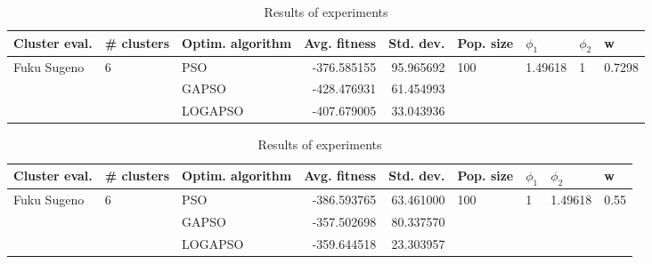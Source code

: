 \documentclass{article}
\begin{document}
\begin{table}
\centering
\caption{Results of experiments}
\begin{tabular}{lllrrllll}
\toprule
               Cluster eval. &        \# clusters & Optim. algorithm &  Avg. fitness &  Std. dev. &            Pop. size &               $\phi_{1}$ &         $\phi_{2}$ &                       w \\
\midrule
\multirow{3}{*}{Fuku Sugeno} & \multirow{3}{*}{6} &              PSO &   -376.585155 &  95.965692 & \multirow{3}{*}{100} & \multirow{3}{*}{1.49618} & \multirow{3}{*}{1} & \multirow{3}{*}{0.7298} \\
                             &                    &            GAPSO &   -428.476931 &  61.454993 &                      &                          &                    &                         \\
                             &                    &          LOGAPSO &   -407.679005 &  33.043936 &                      &                          &                    &                         \\
\bottomrule
\end{tabular}
\end{table}
\begin{table}
\centering
\caption{Results of experiments}
\begin{tabular}{lllrrllll}
\toprule
               Cluster eval. &        \# clusters & Optim. algorithm &  Avg. fitness &  Std. dev. &            Pop. size &         $\phi_{1}$ &               $\phi_{2}$ &                     w \\
\midrule
\multirow{3}{*}{Fuku Sugeno} & \multirow{3}{*}{6} &              PSO &   -386.593765 &  63.461000 & \multirow{3}{*}{100} & \multirow{3}{*}{1} & \multirow{3}{*}{1.49618} & \multirow{3}{*}{0.55} \\
                             &                    &            GAPSO &   -357.502698 &  80.337570 &                      &                    &                          &                       \\
                             &                    &          LOGAPSO &   -359.644518 &  23.303957 &                      &                    &                          &                       \\
\bottomrule
\end{tabular}
\end{table}
\end{document}
